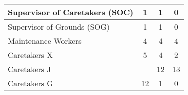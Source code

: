 \begin{tabular}{l|c|c|c|}
        \multicolumn{1}{|l|}{\cellcolor{ccfuschialight}Supervisor of Caretakers (SOC)} & 1                                                      & 1                                                                & 0                                                      \\ \hline
        \multicolumn{1}{|l|}{\cellcolor{ccfuschialight}Supervisor of Grounds (SOG)}    & 1                                                      & 1                                                                & 0                                                      \\ \hline
        \multicolumn{1}{|l|}{\cellcolor{ccfuschialight}Maintenance Workers}            & 4                                                      & 4                                                                & 4                                                       \\ \hline
        \multicolumn{1}{|l|}{\cellcolor{ccfuschialight}Caretakers X}                   & 5                                                      & 4                                                                & 2                                                      \\ \hline
        \multicolumn{1}{|l|}{\cellcolor{ccfuschialight}Caretakers J\tnote{2}}                   &                                                       & 12                                                                & 13                                                        \\ \cline{1-1} \cline{3-4}
        \multicolumn{1}{|l|}{\cellcolor{ccfuschialight}Caretakers G}                   & \multirow{-2}{*}{12}                                                      & 1                                     & 0                            \\ \hline
        \end{tabular}
        
        